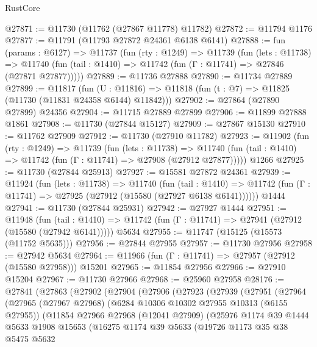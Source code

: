 \begin{lexlean}{RustCore}
\begin{coremodule}
@27871 := @11730 (@11762 (@27867 @11778) @11782)
@27872 := @11794 @1176
@27877 := @11791 (@11793 @27872 @24361 @6138 @6141)
@27888 := fun (params : @6127) =>
  @11737
    (fun (rty : @1249) =>
    @11739
      (fun (lets : @11738) =>
      @11740 (fun (tail : @1410) => @11742 (fun (Γ : @11741) => @27846 (@27871 @27877)))))
@27889 := @11736 @27888
@27890 := @11734 @27889
@27899 := @11817
    (fun (U : @11816) => @11818 (fun (t : @7) => @11825 (@11730 (@11831 @24358 @6144) @11842)))
@27902 := @27864 (@27890 @27899) @24356
@27904 := @11715 @27889 @27899
@27906 := @11899 @27888 @1861
@27908 := @11730 (@27844 @15127)
@27909 := @27867 @15130
@27910 := @11762 @27909
@27912 := @11730 (@27910 @11782)
@27923 := @11902
    (fun (rty : @1249) =>
    @11739
      (fun (lets : @11738) =>
      @11740 (fun (tail : @1410) => @11742 (fun (Γ : @11741) => @27908 (@27912 @27877)))))
    @1266
@27925 := @11730 (@27844 @25913)
@27927 := @15581 @27872 @24361
@27939 := @11924
    (fun (lets : @11738) =>
    @11740
      (fun (tail : @1410) =>
      @11742 (fun (Γ : @11741) => @27925 (@27912 (@15580 (@27927 @6138 @6141))))))
    @1444
@27941 := @11730 (@27844 @25931)
@27942 := @27927 @1444
@27951 := @11948
    (fun (tail : @1410) => @11742 (fun (Γ : @11741) => @27941 (@27912 (@15580 (@27942 @6141)))))
    @5634
@27955 := @11747 (@15125 (@15573 (@11752 @5635)))
@27956 := @27844 @27955
@27957 := @11730 @27956
@27958 := @27942 @5634
@27964 := @11966 (fun (Γ : @11741) => @27957 (@27912 (@15580 @27958))) @15201
@27965 := @11854 @27956
@27966 := @27910 @15204
@27967 := @11730 @27966
@27968 := @25960 @27958
@28176 := @27841
    (@27863
      (@27902
        (@27904
          (@27906
            (@27923
              (@27939
                (@27951
                  (@27964
                    (@27965
                      (@27967 @27968)
                      (@6284 @10306 @10302 @27955 @10313 (@6155 @27955))
                      (@11854
                        @27966
                        @27968
                        (@12041 @27909)
                        (@25976
                          @1174
                          @39
                          @1444
                          @5633
                          @1908
                          @15653
                          (@16275
                            @1174
                            @39
                            @5633
                            (@19726
                              @1173
                              @35
                              @38
                              @5475
                              @5632

\end{coremodule}
\end{lexlean}
